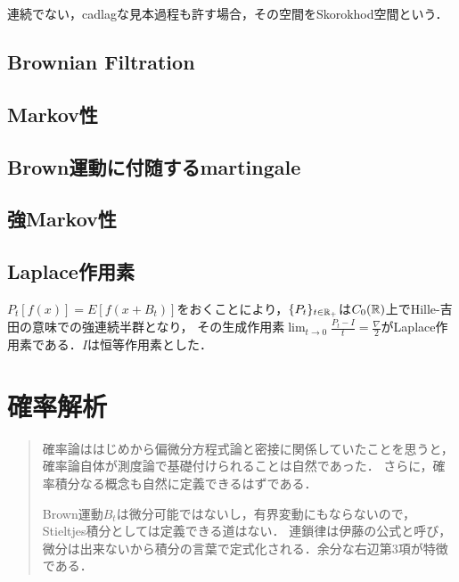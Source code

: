 \documentclass[uplatex,dvipdfmx]{jsreport}
\begin{document}
\begin{tcolorbox}[colframe=ForestGreen, colback=ForestGreen!10!white,breakable,colbacktitle=ForestGreen!40!white,coltitle=black,fonttitle=\bfseries\sffamily,
title=]
    連続でない，cadlagな見本過程も許す場合，その空間をSkorokhod空間という．
\end{tcolorbox}

\section{Brownian Filtration}

\section{Markov性}

\section{Brown運動に付随するmartingale}

\section{強Markov性}

\section*{Laplace作用素}

\begin{tcolorbox}[colframe=ForestGreen, colback=ForestGreen!10!white,breakable,colbacktitle=ForestGreen!40!white,coltitle=black,fonttitle=\bfseries\sffamily,
title=]
    $P_t[f(x)]=E[f(x+B_t)]$をおくことにより，$\{P_t\}_{t\in\mathbb{R}_+}$は$C_0(\mathbb{R})$上でHille-吉田の意味での強連続半群となり，
    その生成作用素$\lim_{t\to0}\frac{P_t-I}{t}=\frac{\nabla}{2}$がLaplace作用素である．$I$は恒等作用素とした．
\end{tcolorbox}

\chapter{確率解析}

\begin{quotation}
    確率論ははじめから偏微分方程式論と密接に関係していたことを思うと，確率論自体が測度論で基礎付けられることは自然であった．
    さらに，確率積分なる概念も自然に定義できるはずである．

    Brown運動$B_t$は微分可能ではないし，有界変動にもならないので，Stieltjes積分としては定義できる道はない．
    連鎖律は伊藤の公式と呼び，微分は出来ないから積分の言葉で定式化される．余分な右辺第3項が特徴である．
\end{quotation}
\end{document}
